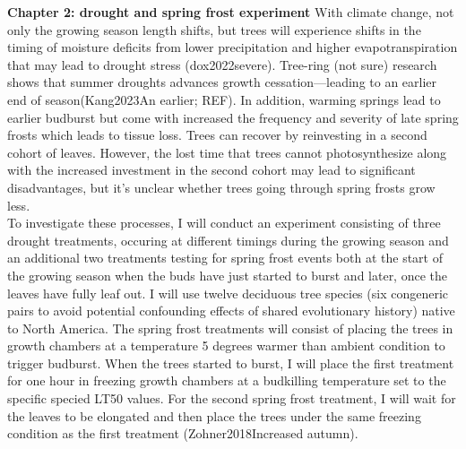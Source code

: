\documentclass[12pt]{article}
\begin{document}
\textbf{Chapter 2: drought and spring frost experiment}
With climate change, not only the growing season length shifts, but trees will experience shifts in the timing of moisture deficits from lower precipitation and higher evapotranspiration that may lead to drought stress (dox2022severe). Tree-ring (not sure) research shows that summer droughts advances growth cessation---leading to an earlier end of season(Kang2023An earlier; REF). In addition, warming springs lead to earlier budburst but come with increased the frequency and severity of late spring frosts which leads to tissue loss. Trees can recover by reinvesting in a second cohort of leaves. However, the lost time that trees cannot photosynthesize along with the increased investment in the second cohort may lead to significant disadvantages, but it's unclear whether trees going through spring frosts grow less. \\
To investigate these processes, I will conduct an experiment consisting of three drought treatments, occuring at different timings during the growing season and an additional two treatments testing for spring frost events both at the start of the growing season when the buds have just started to burst and later, once the leaves have fully leaf out. I will use twelve deciduous tree species (six congeneric pairs to avoid potential confounding effects of shared evolutionary history) native to North America. The spring frost treatments will consist of placing the trees in growth chambers at a temperature 5 degrees warmer than ambient condition to trigger budburst. When the trees started to burst, I will place the first treatment for one hour in freezing growth chambers at a budkilling temperature set to the specific specied LT50 values. For the second spring frost treatment, I will wait for the leaves to be elongated and then place the trees under the same freezing condition as the first treatment (Zohner2018Increased autumn).\\
\end{document}
